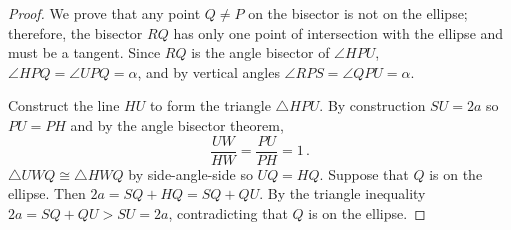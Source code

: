 
\begin{proof} 
We prove that any point $Q\neq P$ on the bisector is not on the ellipse; therefore, the bisector $RQ$ has only one point of intersection with the ellipse and must be a tangent. Since $RQ$ is the angle bisector of $\angle HPU$, $\angle HPQ =\angle UPQ=\alpha$, and by vertical angles $\angle RPS=\angle QPU=\alpha$.

Construct the line $HU$ to form the triangle $\triangle HPU$. By construction $SU=2a$ so $PU=PH$ and by the angle bisector theorem,
\[
\frac{UW}{HW}=\frac{PU}{PH} = 1\,.
\] 
$\triangle UWQ\cong\triangle HWQ$ by side-angle-side so $UQ=HQ$. Suppose that $Q$ is on the ellipse. Then $2a=SQ+HQ=SQ+QU$. By the triangle inequality $2a=SQ+QU>SU=2a$, contradicting that $Q$ is on the ellipse.\hqed
\end{proof}


